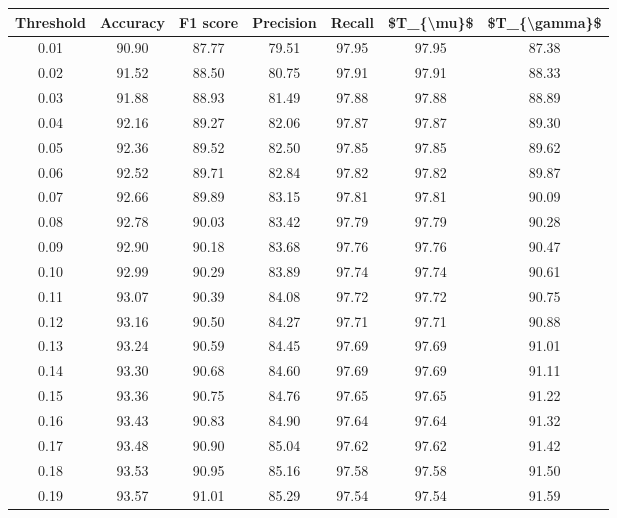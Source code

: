 \begin{tabular}{|c|c|c|c|c|c|c|}
\hline
 Threshold &  Accuracy &  F1 score &  Precision &  Recall &  \$T\_\{\textbackslash mu\}\$ &  \$T\_\{\textbackslash gamma\}\$ \\
\hline
      0.01 &     90.90 &     87.77 &      79.51 &   97.95 &      97.95 &         87.38 \\
      0.02 &     91.52 &     88.50 &      80.75 &   97.91 &      97.91 &         88.33 \\
      0.03 &     91.88 &     88.93 &      81.49 &   97.88 &      97.88 &         88.89 \\
      0.04 &     92.16 &     89.27 &      82.06 &   97.87 &      97.87 &         89.30 \\
      0.05 &     92.36 &     89.52 &      82.50 &   97.85 &      97.85 &         89.62 \\
      0.06 &     92.52 &     89.71 &      82.84 &   97.82 &      97.82 &         89.87 \\
      0.07 &     92.66 &     89.89 &      83.15 &   97.81 &      97.81 &         90.09 \\
      0.08 &     92.78 &     90.03 &      83.42 &   97.79 &      97.79 &         90.28 \\
      0.09 &     92.90 &     90.18 &      83.68 &   97.76 &      97.76 &         90.47 \\
      0.10 &     92.99 &     90.29 &      83.89 &   97.74 &      97.74 &         90.61 \\
      0.11 &     93.07 &     90.39 &      84.08 &   97.72 &      97.72 &         90.75 \\
      0.12 &     93.16 &     90.50 &      84.27 &   97.71 &      97.71 &         90.88 \\
      0.13 &     93.24 &     90.59 &      84.45 &   97.69 &      97.69 &         91.01 \\
      0.14 &     93.30 &     90.68 &      84.60 &   97.69 &      97.69 &         91.11 \\
      0.15 &     93.36 &     90.75 &      84.76 &   97.65 &      97.65 &         91.22 \\
      0.16 &     93.43 &     90.83 &      84.90 &   97.64 &      97.64 &         91.32 \\
      0.17 &     93.48 &     90.90 &      85.04 &   97.62 &      97.62 &         91.42 \\
      0.18 &     93.53 &     90.95 &      85.16 &   97.58 &      97.58 &         91.50 \\
      0.19 &     93.57 &     91.01 &      85.29 &   97.54 &      97.54 &         91.59 \\

\end{tabular}
